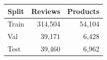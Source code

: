 \begin{tabular}{lrr}
\toprule
Split & Reviews & Products \\
\midrule
Train & 314,504 & 54,104 \\
Val & 39,171 & 6,428 \\
Test & 39,460 & 6,962 \\
\bottomrule
\end{tabular}
